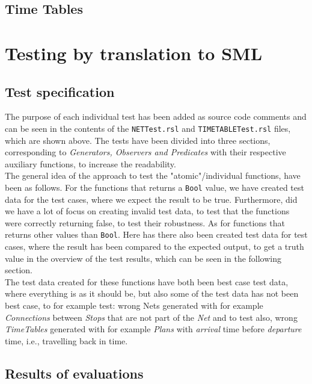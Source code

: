 \documentclass[a4]{article}
\begin{document}
\subsection{Time Tables}



\section{Testing by translation to SML}

\subsection{Test specification}

The purpose of each individual test has been added as source code comments and can be seen in the contents of the \verb=NETTest.rsl=  and \verb=TIMETABLETest.rsl= files, which are shown above. The tests have been divided into three sections, corresponding to \emph{Generators, Observers and Predicates} with their respective auxiliary functions, to increase the readability.\\

The general idea of the approach to test the "atomic"/individual functions, have been as follows. For the functions that returns a \verb=Bool= value, we have created test data for the test cases, where we expect the result to be true. Furthermore, did we have a lot of focus on creating invalid test data, to test that the functions were correctly returning false, to test their robustness. As for functions that returns other values than \verb=Bool=. 
Here has there also been created test data for test cases, where the result has been compared to the expected output, to get a truth value in the overview of the test results, which can be seen in the following section.\\

The test data created for these functions have both been best case test data, where everything is as it should be, but also some of the test data has not been best case, to for example test: wrong Nets generated with for example \emph{Connections} between \emph{Stops} that are not part of the \emph{Net} and to test also, wrong \emph{TimeTables} generated with for example \emph{Plans} with \emph{arrival} time before \emph{departure} time, i.e., travelling back in time.

\subsection{Results of evaluations}
\end{document}
